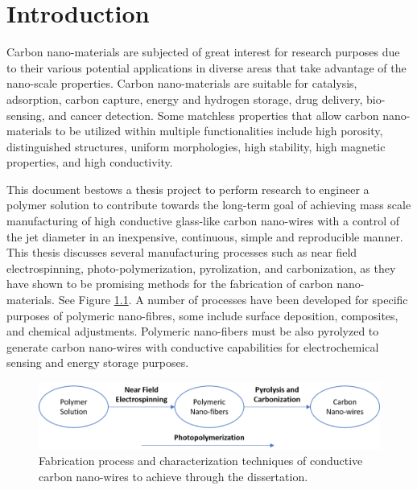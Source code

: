 
\chapter{Introduction} %

\label{Chapter:1}

Carbon nano-materials are subjected of great interest for research purposes due to their various potential applications in diverse areas that take advantage of the nano-scale properties. Carbon nano-materials are suitable for catalysis, adsorption, carbon capture, energy and hydrogen storage, drug delivery, bio-sensing, and cancer detection. \cite{Kenry2017, BaudritJ2017} Some matchless properties that allow carbon nano-materials to be utilized within multiple functionalities include high porosity, distinguished structures, uniform morphologies, high stability, high magnetic properties, and high conductivity. \cite{McCreery2008, Geim2011, Zhu2010, Katsnelson2008, Li2008, Geim2007, Geim2009, Siddiqui2019}

This document bestows a thesis project to perform research to engineer a polymer solution to contribute towards the long-term goal of achieving mass scale manufacturing of high conductive glass-like carbon nano-wires with a control of the jet diameter in an inexpensive, continuous, simple and reproducible manner. This thesis discusses several manufacturing processes such as near field electrospinning, photo-polymerization, pyrolization, and carbonization, as they have shown to be promising methods for the fabrication of carbon nano-materials. \cite{Cardenas2017} See Figure \ref{fig:fabricationFlowChart}. A number of processes have been developed for specific purposes of polymeric nano-fibres, some include surface deposition, composites, and chemical adjustments. Polymeric nano-fibers must be also pyrolyzed to generate carbon nano-wires with conductive capabilities \cite{Madou2011} for electrochemical sensing and energy storage purposes.

\begin{figure}[!th]
\centering
\includegraphics[width=1.0\textwidth]{./Figures/FabricationProcess.png}
\decoRule
\caption[Fabrication Process of Carbon Nano-wires]{Fabrication process and characterization techniques of conductive carbon nano-wires to achieve through the dissertation.}
\label{fig:fabricationFlowChart}
\end{figure}

